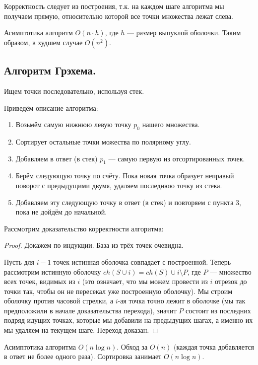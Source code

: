 \begin{remark}
  Корректность следует из построения, т.к. на каждом шаге алгоритма мы получаем прямую, относительно
  которой все точки множества лежат слева.
\end{remark}

\begin{remark}
  Асимптотика алгоритм $O(n \cdot h)$, где $h$ --- размер выпуклой оболочки. Таким образом, в худшем 
  случае $O(n^2)$.
\end{remark}

\subsection{Алгоритм Грэхема.}
Ищем точки последовательно, используя стек.

Приведём описание алгоритма:
\begin{enumerate}
  \item Возьмём самую нижнюю левую точку $p_0$ нашего множества.
  \item Сортирует остальные точки можества по полярному углу.
  \item Добавляем в ответ (в стек) $p_1$ --- самую первую из отсортированных точек.
  \item Берём следующую точку по счёту. Пока новая точка образует неправый поворот с предыдущими двумя,
    удаляем последнюю точку из стека.
  \item Добавляем эту следующую точку в ответ (в стек) и повторяем с пункта 3, пока не дойдём до начальной.
\end{enumerate}

Рассмотрим доказательство корректности алгоритма:
\begin{proof}
  Докажем по индукции. База из трёх точек очевидна.

  Пусть для $i - 1$ точек истинная оболочка совпадает с построенной. Теперь рассмотрим истинную
  оболочку $ch(S \cup i) = ch(S) \cup i \setminus P$, где $P$ --- множество всех точек, видимых из
  $i$ (это означает, что мы можем провести из $i$ отрезок до точки так, чтобы он не пересекал уже
  построенную оболочку). Мы строим оболочку против часовой стрелки, а $i$-ая точка точно лежит в 
  оболочке (мы так предположили в начале доказательства перехода), значит $P$ состоит из последних
  подряд идущих точках, которые мы добавили на предыдущих шагах, а именно их мы удаляем на текущем шаге.
  Переход доказан.
\end{proof}

\begin{remark}
  Асимптотика алгоритма $O(n\log n)$. Обход за $O(n)$ (каждая точка добавляется в ответ не более одного
  раза). Сортировка занимает $O(n \log n)$.
\end{remark}

